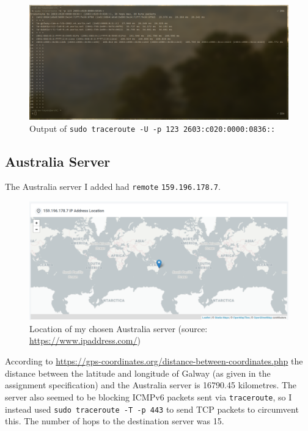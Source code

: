 \documentclass[a4paper]{article}
\begin{document}
\begin{figure}[H]
    \centering
    \includegraphics[width=\textwidth]{./images/ustraceroute.png}
    \caption{Output of \texttt{sudo traceroute -U -p 123 2603:c020:0000:0836::}}
\end{figure}

\subsection{Australia Server}
The Australia server I added had \verb|remote| \verb|159.196.178.7|.

\begin{figure}[H]
    \centering
    \includegraphics[width=\textwidth]{./images/australiaserverloc.png}
    \caption{Location of my chosen Australia server (source: \url{https://www.ipaddress.com/})}
\end{figure}

According to \url{https://gps-coordinates.org/distance-between-coordinates.php} the distance between the latitude and longitude of Galway (as given in the assignment specification) and the Australia server is 16790.45 kilometres.
The server also seemed to be blocking ICMPv6 packets sent via \texttt{traceroute}, so I instead used \texttt{sudo traceroute -T -p 443} to send TCP packets to circumvent this.
The number of hops to the destination server was 15.
\end{document}
